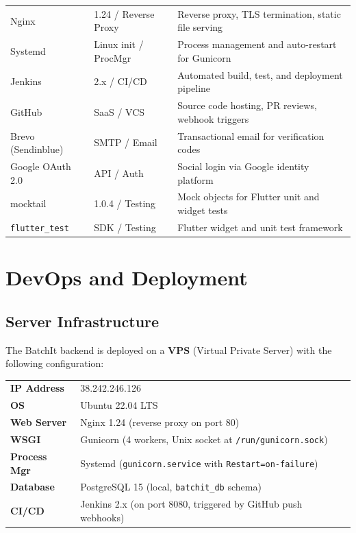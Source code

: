 \documentclass[12pt, a4paper]{report}
\begin{document}
\begin{longtable}{p{3cm} p{3.5cm} p{6cm}}
\rowcolor{batchitLight}
Nginx                  & 1.24 / Reverse Proxy   & Reverse proxy, TLS termination, static file serving\\
Systemd                & Linux init / ProcMgr   & Process management and auto-restart for Gunicorn\\
\rowcolor{batchitLight}
Jenkins                & 2.x / CI/CD            & Automated build, test, and deployment pipeline\\
GitHub                 & SaaS / VCS             & Source code hosting, PR reviews, webhook triggers\\
\rowcolor{batchitLight}
Brevo (Sendinblue)     & SMTP / Email           & Transactional email for verification codes\\
Google OAuth 2.0       & API / Auth             & Social login via Google identity platform\\
\rowcolor{batchitLight}
mocktail               & 1.0.4 / Testing        & Mock objects for Flutter unit and widget tests\\
\texttt{flutter\_test} & SDK / Testing          & Flutter widget and unit test framework\\
\end{longtable}

\newpage
\section{DevOps and Deployment}

\subsection{Server Infrastructure}

The BatchIt backend is deployed on a \textbf{VPS} (Virtual Private Server) with the following configuration:

\begin{tabularx}{\textwidth}{lX}
\toprule
\textbf{IP Address} & 38.242.246.126\\
\rowcolor{batchitLight}
\textbf{OS}         & Ubuntu 22.04 LTS\\
\textbf{Web Server} & Nginx 1.24 (reverse proxy on port 80)\\
\rowcolor{batchitLight}
\textbf{WSGI}       & Gunicorn (4 workers, Unix socket at \texttt{/run/gunicorn.sock})\\
\textbf{Process Mgr}& Systemd (\texttt{gunicorn.service} with \texttt{Restart=on-failure})\\
\rowcolor{batchitLight}
\textbf{Database}   & PostgreSQL 15 (local, \texttt{batchit\_db} schema)\\
\textbf{CI/CD}      & Jenkins 2.x (on port 8080, triggered by GitHub push webhooks)\\
\bottomrule
\end{tabularx}
\end{document}
